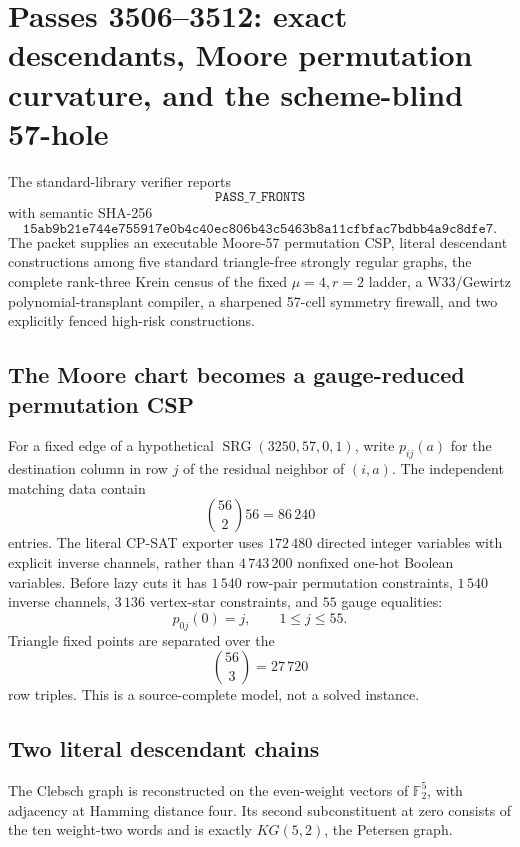 \section{Passes 3506--3512: exact descendants, Moore permutation curvature, and the scheme-blind 57-hole}
\label{sec:bt3506-bt3512}

\begin{tcolorbox}[title={Certified seven-front packet},colback=blue!2!white,colframe=blue!55!black]
The standard-library verifier reports
\[
\texttt{PASS\_7\_FRONTS}
\]
with semantic SHA-256
\[
\texttt{15ab9b21e744e755917e0b4c40ec806b43c5463b8a11cfbfac7bdbb4a9c8dfe7}.
\]
The packet supplies an executable Moore-57 permutation CSP, literal descendant
constructions among five standard triangle-free strongly regular graphs, the
complete rank-three Krein census of the fixed \(\mu=4,r=2\) ladder, a
W33/Gewirtz polynomial-transplant compiler, a sharpened 57-cell symmetry
firewall, and two explicitly fenced high-risk constructions.
\end{tcolorbox}

\subsection{The Moore chart becomes a gauge-reduced permutation CSP}

For a fixed edge of a hypothetical
\(\operatorname{SRG}(3250,57,0,1)\), write \(p_{ij}(a)\) for the destination
column in row \(j\) of the residual neighbor of \((i,a)\).  The independent
matching data contain
\[
\binom{56}{2}56=86\,240
\]
entries.  The literal CP-SAT exporter uses \(172\,480\) directed integer
variables with explicit inverse channels, rather than \(4\,743\,200\)
nonfixed one-hot Boolean variables.  Before lazy cuts it has \(1\,540\)
row-pair permutation constraints, \(1\,540\) inverse channels, \(3\,136\)
vertex-star constraints, and \(55\) gauge equalities:
\[
p_{0j}(0)=j,\qquad1\leq j\leq55.
\]
Triangle fixed points are separated over the
\[
\binom{56}{3}=27\,720
\]
row triples.  This is a source-complete model, not a solved instance.

\subsection{Two literal descendant chains}

The Clebsch graph is reconstructed on the even-weight vectors of
\(\mathbb F_2^5\), with adjacency at Hamming distance four.  Its second
subconstituent at zero consists of the ten weight-two words and is exactly
\(KG(5,2)\), the Petersen graph.

